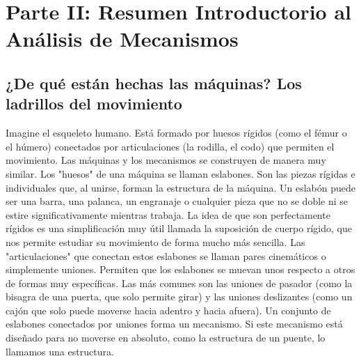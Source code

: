 \documentclass[12pt,a4paper]{article}
\begin{document}
\section{Parte II: Resumen Introductorio al Análisis de Mecanismos}
\subsection{¿De qué están hechas las máquinas? Los ladrillos del movimiento}
Imagine el esqueleto humano. Está formado por huesos rígidos (como el fémur o el húmero) conectados por articulaciones (la rodilla, el codo) que permiten el movimiento. Las máquinas y los mecanismos se construyen de manera muy similar.
Los "huesos" de una máquina se llaman eslabones. Son las piezas rígidas e individuales que, al unirse, forman la estructura de la máquina. Un eslabón puede ser una barra, una palanca, un engranaje o cualquier pieza que no se doble ni se estire significativamente mientras trabaja. La idea de que son perfectamente rígidos es una simplificación muy útil llamada la suposición de cuerpo rígido, que nos permite estudiar su movimiento de forma mucho más sencilla.
Las "articulaciones" que conectan estos eslabones se llaman pares cinemáticos o simplemente uniones. Permiten que los eslabones se muevan unos respecto a otros de formas muy específicas. Las más comunes son las uniones de pasador (como la bisagra de una puerta, que solo permite girar) y las uniones deslizantes (como un cajón que solo puede moverse hacia adentro y hacia afuera).
Un conjunto de eslabones conectados por uniones forma un mecanismo. Si este mecanismo está diseñado para no moverse en absoluto, como la estructura de un puente, lo llamamos una estructura.
\end{document}
